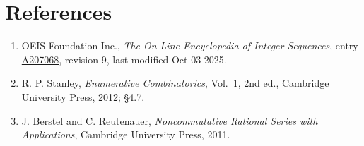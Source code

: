 \documentclass[11pt]{article}
\theoremstyle{definition}
\begin{document}
\section{References}

\begin{enumerate}

\item OEIS Foundation Inc., \emph{The On-Line Encyclopedia of Integer Sequences}, entry \href{https://oeis.org/A207068}{A207068}, revision 9, last modified Oct 03 2025.

\item R. P. Stanley, \emph{Enumerative Combinatorics}, Vol.~1, 2nd ed., Cambridge University Press, 2012; \S4.7.

\item J. Berstel and C. Reutenauer, \emph{Noncommutative Rational Series with Applications}, Cambridge University Press, 2011.

\end{enumerate}
\end{document}
